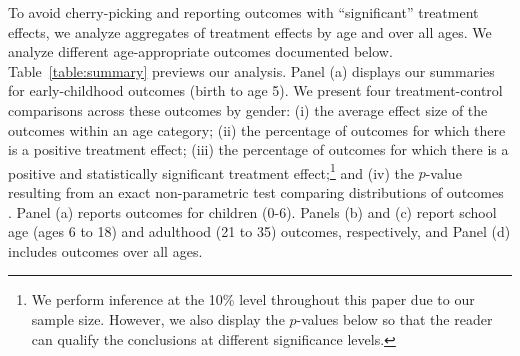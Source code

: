 To avoid cherry-picking and reporting outcomes with ``significant'' treatment effects, we analyze aggregates of treatment effects by age and over all ages. We analyze different age-appropriate outcomes documented below. Table~\ref{table:summary} previews our analysis. Panel (a) displays our summaries for early-childhood outcomes (birth to age 5). We present four treatment-control comparisons across these outcomes by gender: (i) the average effect size of the outcomes within an age category; (ii) the percentage of outcomes for which there is a positive treatment effect; (iii) the percentage of outcomes for which there is a positive and statistically significant treatment effect;\footnote{We perform inference at the 10\% level throughout this paper due to our sample size. However, we also display the $p$-values below so that the reader can qualify the conclusions at different significance levels.} and (iv) the $p$-value resulting from an exact non-parametric test comparing distributions of outcomes \citep{Rosenbaum_2005_Distribution_JRSS}. Panel (a) reports outcomes for children (0-6). Panels (b) and (c) report school age (ages 6 to 18) and adulthood (21 to 35) outcomes, respectively, and Panel (d) includes outcomes over all ages.


